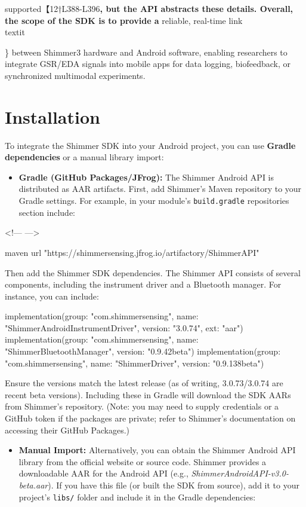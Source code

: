 supported\cite{ref10}【12†L388-L396\textbf{,
but the API abstracts these details. Overall, the scope of the SDK is to
provide a} reliable, real-time link\\textit{\} between Shimmer3 hardware and
Android software, enabling researchers to integrate GSR/EDA signals into
mobile apps for data logging, biofeedback, or synchronized multimodal
experiments.

\section{Installation}

To integrate the Shimmer SDK into your Android project, you can use
\textbf{Gradle dependencies} or a manual library import:

\begin{itemize}
\item \textbf{Gradle (GitHub Packages/JFrog):} The Shimmer Android API is
  distributed as AAR artifacts. First, add Shimmer's Maven repository to
  your Gradle settings. For example, in your module's \texttt{build.gradle}
  repositories section include:

\end{itemize}
<!--- --->

    maven { 
        url "https://shimmersensing.jfrog.io/artifactory/ShimmerAPI" 
    }

Then add the Shimmer SDK dependencies. The Shimmer API consists of
several components, including the instrument driver and a Bluetooth
manager. For instance, you can include:

    implementation(group: "com.shimmersensing", name: "ShimmerAndroidInstrumentDriver", version: "3.0.74", ext: "aar")
    implementation(group: "com.shimmersensing", name: "ShimmerBluetoothManager", version: "0.9.42beta")
    implementation(group: "com.shimmersensing", name: "ShimmerDriver", version: "0.9.138beta")

Ensure the versions match the latest release (as of writing,
3.0.73/3.0.74 are recent beta
versions\cite{ref11}\cite{ref12}).
Including these in Gradle will download the SDK AARs from Shimmer's
repository. (Note: you may need to supply credentials or a GitHub token
if the packages are private; refer to Shimmer's documentation on
accessing their GitHub Packages.)

\begin{itemize}
\item \textbf{Manual Import:} Alternatively, you can obtain the Shimmer Android
  API library from the official website or source code. Shimmer provides
  a downloadable AAR for the Android API (e.g.,
  \textit{ShimmerAndroidAPI-v3.0-beta.aar}). If you have this file (or built
  the SDK from source), add it to your project's \texttt{libs/} folder and
  include it in the Gradle dependencies:


\end{itemize}}
